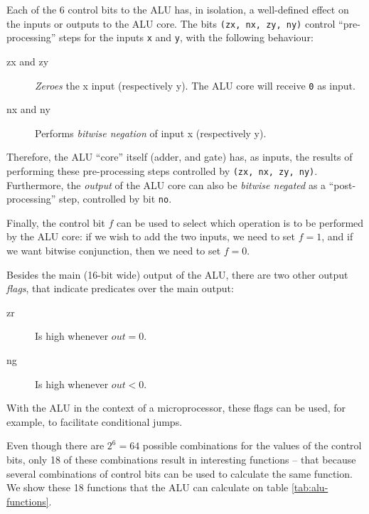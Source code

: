 \documentclass[a4paper]{article}
\begin{document}
            Each of the 6 control bits to the ALU has, in isolation, a well-defined effect on the
            inputs or outputs to the ALU core. The bits \texttt{(zx, nx, zy, ny)} control
            ``pre-processing'' steps for the inputs \texttt{x} and \texttt{y}, with the following
            behaviour:
            \begin{description}
                \item[zx and zy] \emph{Zeroes} the x input (respectively y). The ALU core will
                    receive \texttt{0} as input.
                \item[nx and ny] Performs \emph{bitwise negation} of input x (respectively y).
            \end{description}

            Therefore, the ALU ``core'' itself (adder, and gate) has, as inputs, the results of
            performing these pre-processing steps controlled by \texttt{(zx, nx, zy, ny)}.
            Furthermore, the \emph{output} of the ALU core can also be \emph{bitwise negated} as a
            ``post-processing'' step, controlled by bit \texttt{no}.

            Finally, the control bit $f$ can be used to select which operation is to be performed by
            the ALU core: if we wish to add the two inputs, we need to set $f = 1$, and if we want
            bitwise conjunction, then we need to set $f = 0$.

            Besides the main (16-bit wide) output of the ALU, there are two other output
            \emph{flags}, that indicate predicates over the main output:
            \begin{description}
                \item[zr] Is high whenever $out = 0$.
                \item[ng] Is high whenever $out < 0$.
            \end{description}

            With the ALU in the context of a microprocessor, these flags can be used, for example,
            to facilitate conditional jumps.

            Even though there are $2^{6} = 64$ possible combinations for the values of the control
            bits, only 18 of these combinations result in interesting functions -- that because
            several combinations of control bits can be used to calculate the same function. We show
            these 18 functions that the ALU can calculate on table \ref{tab:alu-functions}.
            
\end{document}
